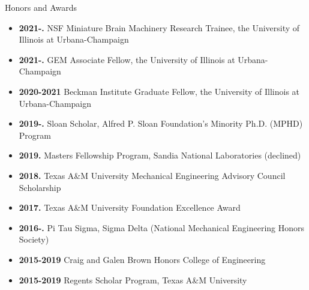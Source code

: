 \documentclass{resume} %
\begin{document}



\begin{rSection}{Honors and Awards}
\begin{itemize}
    \item \textbf{2021-.} NSF Miniature Brain Machinery Research Trainee, the University of Illinois at Urbana-Champaign
    \item \textbf{2021-.} GEM Associate Fellow, the University of Illinois at Urbana-Champaign
    \item \textbf{2020-2021} Beckman Institute Graduate Fellow, the University of Illinois at Urbana-Champaign
    \item \textbf{2019-.} Sloan Scholar, Alfred P. Sloan Foundation's Minority Ph.D. (MPHD) Program
    \item \textbf{2019.} Masters Fellowship Program, Sandia National Laboratories (declined)
    \item \textbf{2018.} Texas A\&M University Mechanical Engineering Advisory Council Scholarship
    \item \textbf{2017.} Texas A\&M University Foundation Excellence Award
    \item \textbf{2016-.} Pi Tau Sigma, Sigma Delta (National Mechanical Engineering Honors Society)
    \item \textbf{2015-2019} Craig and Galen Brown Honors College of Engineering
    \item \textbf{2015-2019} Regents Scholar Program, Texas A\&M University
\end{itemize}
\end{rSection}
\end{document}
